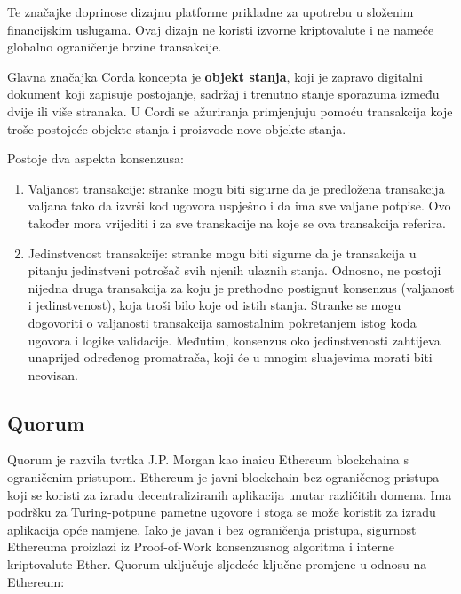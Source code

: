 \documentclass[times, utf8, diplomski]{fer}
\begin{document}
Te značajke doprinose dizajnu platforme prikladne za upotrebu u složenim  financijskim uslugama. Ovaj dizajn ne koristi izvorne kriptovalute i ne nameće
globalno ograničenje brzine transakcije.

Glavna značajka Corda koncepta je \textbf{objekt stanja}, koji je zapravo digitalni dokument koji zapisuje postojanje, sadržaj i trenutno stanje sporazuma između dvije ili više stranaka. U Cordi se ažuriranja primjenjuju pomoću transakcija koje troše postojeće objekte stanja i proizvode nove objekte stanja. 

Postoje dva aspekta konsenzusa:

\begin{enumerate}

\item Valjanost transakcije: stranke mogu biti sigurne da je predložena transakcija valjana tako da izvrši kod ugovora uspješno i da ima sve valjane potpise. Ovo također mora vrijediti i za sve transkacije na koje se ova transakcija referira.

\item Jedinstvenost transakcije: stranke mogu biti sigurne da je transakcija u pitanju jedinstveni potrošač svih njenih ulaznih stanja. Odnosno, ne postoji nijedna druga transakcija za koju je prethodno postignut konsenzus (valjanost i jedinstvenost), koja troši bilo koje od istih stanja. Stranke se mogu dogovoriti o valjanosti transakcija samostalnim pokretanjem istog koda ugovora i logike validacije. Međutim, konsenzus oko jedinstvenosti zahtijeva unaprijed određenog promatrača,  koji će u mnogim sluajevima morati biti neovisan.

\end{enumerate}

\subsection{Quorum}

Quorum je razvila tvrtka J.P. Morgan kao inaicu Ethereum blockchaina s ograničenim pristupom. Ethereum je javni blockchain bez ograničenog pristupa koji se koristi za izradu decentraliziranih aplikacija unutar različitih domena. Ima podršku za Turing-potpune pametne ugovore i stoga se može koristit za izradu aplikacija opće namjene.  Iako je javan i bez ograničenja pristupa, sigurnost Ethereuma proizlazi iz Proof-of-Work konsenzusnog algoritma i interne kriptovalute Ether. Quorum uključuje sljedeće ključne promjene u odnosu na Ethereum:
\end{document}
